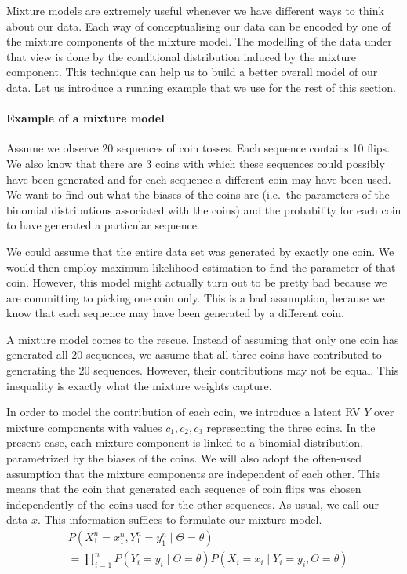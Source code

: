Mixture models are extremely useful whenever we have different ways to think about our data. Each way
of conceptualising our data can be encoded by one of the mixture components of the mixture model. The modelling
of the data under that view is done by the conditional distribution induced by the mixture component.
This technique can help us to build a better overall model of our data. Let us introduce a running example that
we use for the rest of this section. 

\paragraph{Example of a mixture model} Assume we observe 20 sequences of coin tosses. Each sequence
contains 10 flips. We also know that there are 3 coins with which these sequences could possibly have been
generated and for each sequence a different coin may have been used. We want to find out what the biases
of the coins are (i.e.\ the parameters of the binomial distributions associated with the coins) and the probability
for each coin to have generated a particular sequence.
 
We could assume that the entire data set was generated by exactly one coin. We would then employ maximum likelihood estimation 
to find the parameter of that coin. However, this model might actually turn out to be
pretty bad because we are committing to picking one coin only. This is
a bad assumption, because we know that each sequence may have been generated by a different coin. 

A mixture model comes to the rescue. Instead of assuming that only one coin has generated all 20 sequences,
we assume that all three coins have contributed to generating the 20 sequences. However, their contributions
may not be equal. This inequality is exactly what the mixture weights capture. 

In order to model the contribution of each coin, we introduce a latent RV $ Y $ over mixture components with values $ c_{1}, c_{2}, c_{3} $ representing the three coins.
In the present case, each mixture component is linked to a binomial distribution, parametrized by the biases of
the coins. We will also adopt the often-used assumption
that the mixture components are independent of each other. This means that the coin that generated each
sequence of coin flips was chosen independently of the coins used for the other sequences. As usual, we call our data $ x $. 
This information suffices to formulate our mixture model.
\begin{align} 
&P(X_1^n=x_{1}^{n},Y_{1}^{n}=y_{1}^{n}\mid \Theta=\theta) \label{eq:mixtureExample} \\
&= \prod_{i=1}^{n} P(Y_{i}= y_{i} \mid \Theta=\theta)P(X_{i}=x_{i} \mid Y_{i}=y_{i},\Theta=\theta) \nonumber 
\end{align}

